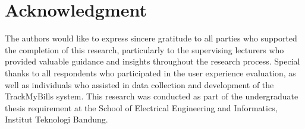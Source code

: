 \section*{Acknowledgment}

The authors would like to express sincere gratitude to all parties who supported the completion of this research, particularly to the supervising lecturers who provided valuable guidance and insights throughout the research process. Special thanks to all respondents who participated in the user experience evaluation, as well as individuals who assisted in data collection and development of the TrackMyBills system. This research was conducted as part of the undergraduate thesis requirement at the School of Electrical Engineering and Informatics, Institut Teknologi Bandung.